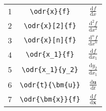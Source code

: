 \documentclass{jsarticle}
\renewcommand{\d}{\textrm{d}}
\begin{document}
%
\begin{table}[htpt]
\centering
\begin{tabular}{ccc}
1&	\verb|\odr{x}{f}|				& $\displaystyle \frac{\d f}{\d x}$ \\[3mm]
2&	\verb|\odr{x}[2]{f}|			& $\displaystyle \frac{\d^2 f}{\d x^2}$ \\[3mm]
3&	\verb|\odr{x}[n]{f}|			& $\displaystyle \frac{\d^n f}{\d x^n}$ \\[3mm]
4&	\verb|\odr{x_1}{f}|				& $\displaystyle \frac{\d f}{\d x_1}$ \\[3mm]
5&	\verb|\odr{x_1}{y_2}|			& $\displaystyle \frac{\d y_2}{\d x_1}$ \\[3mm]
6&	\verb|\odr{t}{\bm{u}}|			& $\displaystyle \frac{\d\bm{u}}{\d t}$ \\[3mm]
7&	\verb|\odr{\bm{x}}{f}|			& $\displaystyle \frac{\d f}{\d\bm{x}}$ \\[3mm]
\end{tabular}
\end{table}
%
\end{document}
